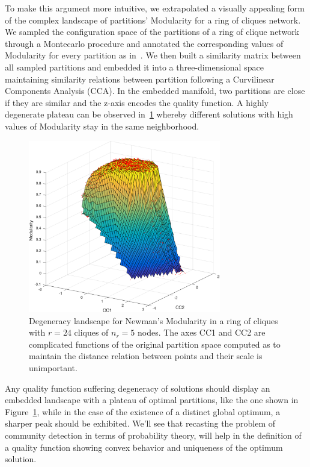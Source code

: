 To make this argument more intuitive, we extrapolated a visually appealing form of the complex landscape of partitions' Modularity for a ring of cliques network. We sampled the configuration space of the partitions of a ring of clique network through a Montecarlo procedure and annotated the corresponding values of Modularity for every partition as in~\cite{good2009}.
We then built a similarity matrix between all sampled partitions and embedded it into a three-dimensional space maintaining similarity relations between partition following a Curvilinear Components Analysis (CCA).
In the embedded manifold, two partitions are close if they are similar and the z-axis encodes the quality function.
A highly degenerate plateau can be observed in~\ref{fig:degeneracylandscape} whereby different solutions with high values of Modularity stay in the same neighborhood.

\begin{figure}[htb!]
\centering
\includegraphics[width=0.75\textwidth]{images/degeneracy_modularity.pdf}
\caption{Degeneracy landscape for Newman's Modularity in a ring of cliques with $r=24$ cliques of $n_r=5$ nodes. The axes CC1 and CC2 are complicated functions of the original partition space computed as to maintain the distance relation between points and their scale is unimportant.}
\label{fig:degeneracylandscape}
\end{figure}

Any quality function suffering degeneracy of solutions should display an embedded landscape with a plateau of optimal partitions, like the one shown in Figure~\ref{fig:degeneracylandscape}, while in the case of the existence of a distinct global optimum, a sharper peak should be exhibited.
We'll see that recasting the problem of community detection in terms of probability theory, will help in the definition of a quality function showing convex behavior and uniqueness of the optimum solution.

